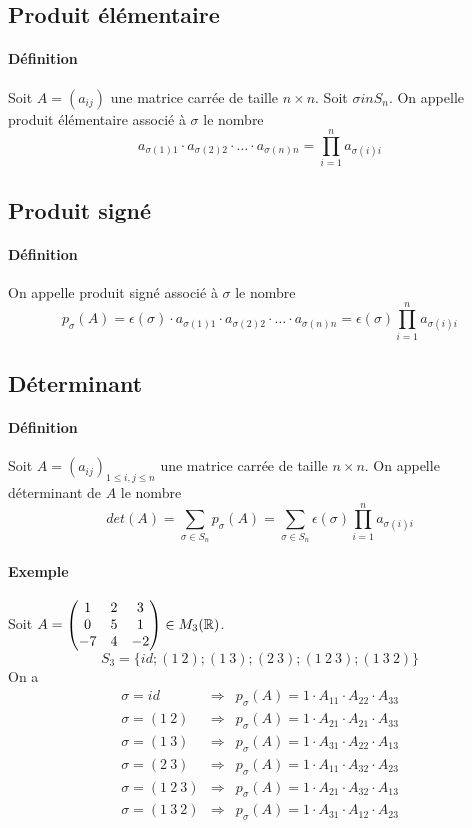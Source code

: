 %
\subsection{Produit élémentaire}
%
\paragraph{Définition} Soit $A = (a_{ij})$ une matrice carrée de taille $n\times n$. Soit $\sigma in S_n$. On appelle produit élémentaire associé à $\sigma$ le nombre
$$a_{\sigma(1) 1} \cdot a_{\sigma(2) 2} \cdot \ldots \cdot a_{\sigma(n) n} = \prod_{i=1}^{n} a_{\sigma(i) i}$$
%
\subsection{Produit signé}
%
\paragraph{Définition} On appelle produit signé associé à $\sigma$ le nombre 
$$p_{\sigma}(A) = \epsilon(\sigma) \cdot a_{\sigma(1) 1} \cdot a_{\sigma(2) 2} \cdot \ldots \cdot a_{\sigma(n) n} = \epsilon(\sigma) \prod_{i=1}^{n} a_{\sigma(i) i}$$

%
\subsection{Déterminant}
%
\paragraph{Définition} Soit $A = (a_{ij})_{1 \leq i, j \leq n}$ une matrice carrée de taille $n \times n$. On appelle déterminant de $A$ le nombre
$$det(A) = \sum_{\sigma \in S_n} p_{\sigma}(A) = \sum_{\sigma \in S_n} \epsilon(\sigma) \prod_{i=1}^{n} a_{\sigma(i) i}$$

\paragraph{Exemple} Soit $A = \begin{pmatrix} 1 & 2 & 3 \\ 0 & 5 & 1 \\ -7 & 4 & -2 \end{pmatrix} \in M_{3}(\mathbb{R})$.
$$S_3 = \{id; (1 ~ 2); (1 ~ 3); (2 ~ 3); (1 ~ 2 ~ 3); (1 ~ 3 ~ 2)\}$$
On a 
\begin{eqnarray*}
  \sigma = id           &\Rightarrow& p_{\sigma}(A) = 1 \cdot A_{11} \cdot A_{22} \cdot A_{33} \\
  \sigma = (1 ~ 2)      &\Rightarrow& p_{\sigma}(A) = 1 \cdot A_{21} \cdot A_{21} \cdot A_{33} \\
  \sigma = (1 ~ 3)      &\Rightarrow& p_{\sigma}(A) = 1 \cdot A_{31} \cdot A_{22} \cdot A_{13} \\
  \sigma = (2 ~ 3)      &\Rightarrow& p_{\sigma}(A) = 1 \cdot A_{11} \cdot A_{32} \cdot A_{23} \\
  \sigma = (1 ~ 2 ~ 3)  &\Rightarrow& p_{\sigma}(A) = 1 \cdot A_{21} \cdot A_{32} \cdot A_{13} \\
  \sigma = (1 ~ 3 ~ 2)  &\Rightarrow& p_{\sigma}(A) = 1 \cdot A_{31} \cdot A_{12} \cdot A_{23}
\end{eqnarray*}


